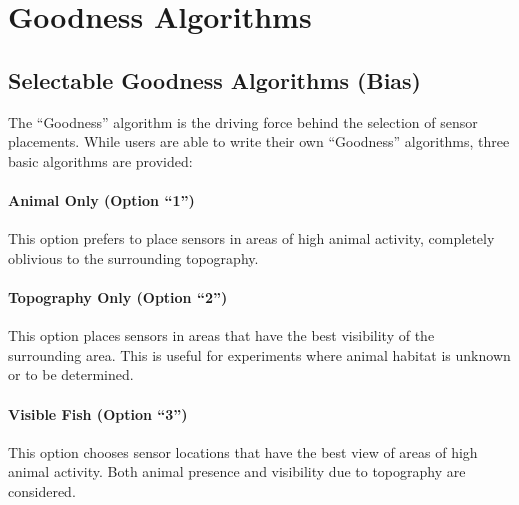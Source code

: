 \section{Goodness Algorithms}
\subsection{Selectable Goodness Algorithms (Bias)}
The “Goodness” algorithm is the driving force behind the selection of sensor placements.  While users are able to write their own “Goodness” algorithms, three basic algorithms are provided: 

\paragraph{Animal Only (Option “1”)}
This option prefers to place sensors in areas of high animal activity, completely oblivious to the surrounding topography.  

\paragraph{Topography Only (Option “2”)}
This option places sensors in areas that have the best visibility of the surrounding area.  This is useful for experiments where animal habitat is unknown or to be determined.

\paragraph{Visible Fish (Option “3”)}
This option chooses sensor locations that have the best view of areas of high animal activity.  Both animal presence and visibility due to topography are considered.

